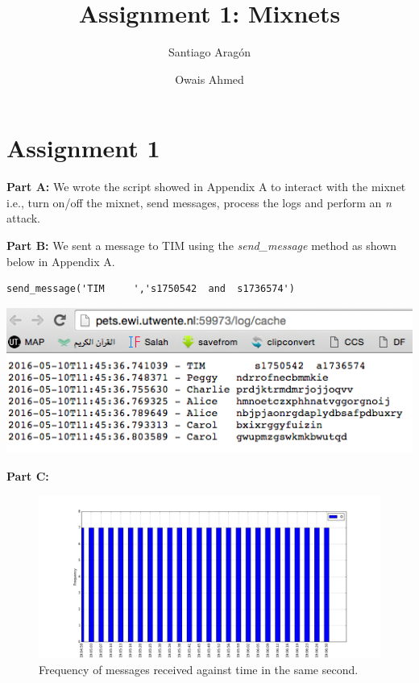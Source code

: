 \documentclass[preprint,12pt,3p]{elsarticle}
\begin{document}
\begin{frontmatter}

\title{Assignment 1: Mixnets}

\author{Santiago Aragón}
\address{s.e.aragonramirez@student.utwente.nl}

\author{Owais Ahmed}
\address{o.ahmed@student.utwente.nl}
\address{University of Twente}



\end{frontmatter}





\section*{Assignment 1}
\textbf{Part A:}
We wrote the script showed in Appendix A to interact with the mixnet i.e., turn on/off the mixnet, send messages, process the logs and perform an \textit{n} attack.
\newline

\textbf{Part B:}
We sent a message to TIM using the \textit{send\_message} method as shown below in Appendix A.
\begin{verbatim}send_message('TIM     ','s1750542  and  s1736574') \end{verbatim}

\includegraphics[width=\textwidth]{tim}

\textbf{Part C:}

\begin{figure}[h]
\caption{Frequency of messages received against time in the same second.}
\centering
\includegraphics[width=\textwidth]{one_c}
\end{figure}
\end{document}
